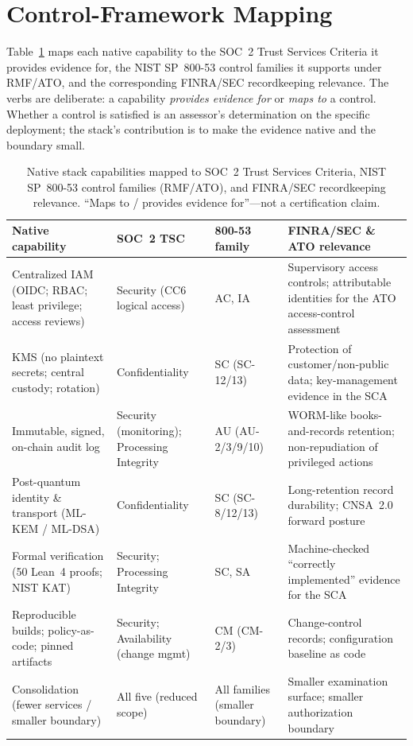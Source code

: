 \documentclass[11pt,letterpaper]{article}
\begin{document}
\section{Control-Framework Mapping}

Table~\ref{tab:mapping} maps each native capability to the SOC~2 Trust Services
Criteria it provides evidence for, the NIST SP~800-53 control families it supports
under RMF/ATO, and the corresponding FINRA/SEC recordkeeping relevance. The verbs are
deliberate: a capability \emph{provides evidence for} or \emph{maps to} a control.
Whether a control is satisfied is an assessor's determination on the specific
deployment; the stack's contribution is to make the evidence native and the boundary
small.

\begin{table}[H]
\centering
\small
\begin{tabular}{@{}p{3.0cm}p{3.1cm}p{2.0cm}p{4.0cm}@{}}
\toprule
\textbf{Native capability} & \textbf{SOC~2 TSC} & \textbf{800-53 family} & \textbf{FINRA/SEC \& ATO relevance} \\
\midrule
Centralized IAM (OIDC; RBAC; least privilege; access reviews)
& Security (CC6 logical access)
& AC, IA
& Supervisory access controls; attributable identities for the ATO access-control assessment \\
\addlinespace
KMS (no plaintext secrets; central custody; rotation)
& Confidentiality
& SC (SC-12/13)
& Protection of customer/non-public data; key-management evidence in the SCA \\
\addlinespace
Immutable, signed, on-chain audit log
& Security (monitoring); Processing Integrity
& AU (AU-2/3/9/10)
& WORM-like books-and-records retention; non-repudiation of privileged actions \\
\addlinespace
Post-quantum identity \& transport (ML-KEM / ML-DSA)
& Confidentiality
& SC (SC-8/12/13)
& Long-retention record durability; CNSA~2.0 forward posture \\
\addlinespace
Formal verification (50 Lean~4 proofs; NIST KAT)
& Security; Processing Integrity
& SC, SA
& Machine-checked ``correctly implemented'' evidence for the SCA \\
\addlinespace
Reproducible builds; policy-as-code; pinned artifacts
& Security; Availability (change mgmt)
& CM (CM-2/3)
& Change-control records; configuration baseline as code \\
\addlinespace
Consolidation (fewer services / smaller boundary)
& All five (reduced scope)
& All families (smaller boundary)
& Smaller examination surface; smaller authorization boundary \\
\bottomrule
\end{tabular}
\caption{Native stack capabilities mapped to SOC~2 Trust Services Criteria, NIST
SP~800-53 control families (RMF/ATO), and FINRA/SEC recordkeeping relevance. ``Maps
to / provides evidence for''---not a certification claim.}
\label{tab:mapping}
\end{table}
\end{document}
